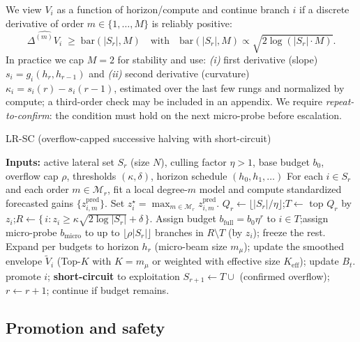 \documentclass{article}
\begin{document}
We view $V_i$ as a function of horizon/compute and continue branch $i$ if a discrete derivative of order $m\in\{1,\dots,M\}$ is reliably positive:
\[
\widehat{\Delta^{(m)} V_i} \;\ge\; \text{bar}(|S_r|,M) \quad\text{with}\quad \text{bar}(|S_r|,M)\propto \sqrt{2\log(|S_r|\cdot M)}.
\]
In practice we cap $M=2$ for stability and use:
\emph{(i)} first derivative (slope) $s_i = g_i(h_r,h_{r-1})$ and
\emph{(ii)} second derivative (curvature) $\kappa_i = s_i(r)-s_i(r-1)$,
estimated over the last few rungs and normalized by compute; a third-order check may be included in an appendix.
We require \emph{repeat-to-confirm}: the condition must hold on the next micro-probe before escalation.

\begin{algorithm}[t]
\caption{LR-SC (overflow-capped successive halving with short-circuit)}
\label{alg:lrscr}
\begin{algorithmic}[1]
\State \textbf{Inputs:} active lateral set $S_r$ (size $N$), culling factor $\eta>1$, base budget $b_0$, overflow cap $\rho$, thresholds $(\kappa,\delta)$, horizon schedule $(h_0,h_1,\dots)$
\State For each $i\in S_r$ and each order $m\in\mathcal{M}_r$, fit a local degree-$m$ model and compute standardized forecasted gains $\{z^{\mathrm{pred}}_{i,m}\}$. Set $z_i^{\star}=\max_{m\in\mathcal{M}_r} z^{\mathrm{pred}}_{i,m}$.
\State $Q_r \leftarrow \lfloor |S_r|/\eta \rfloor$;\quad $T \leftarrow$ top $Q_r$ by $z_i$;\quad $R \leftarrow \{\,i : z_i \ge \kappa \sqrt{2\log |S_r|} + \delta\,\}$.
\State Assign budget $b_{\text{full}} = b_0 \eta^r$ to $i\in T$;\quad assign micro-probe $b_{\text{micro}}$ to up to $\lfloor \rho |S_r|\rfloor$ branches in $R\setminus T$ (by $z_i$); freeze the rest.
\State Expand per budgets to horizon $h_r$ (micro-beam size $m_{\mu}$); update the smoothed envelope $\tilde V_i$ (Top-$K$ with $K{=}m_{\mu}$ or weighted with effective size $K_{\mathrm{eff}}$); update $B_t$.
  \State promote $i$; \textbf{short-circuit} to exploitation
\EndIf
\State $S_{r+1} \leftarrow T \cup$ (confirmed overflow); $r\leftarrow r+1$; continue if budget remains.
\end{algorithmic}
\end{algorithm}

\vspace{-0.5em}
\subsection{Promotion and safety}
\label{sec:promotion}
\end{document}
